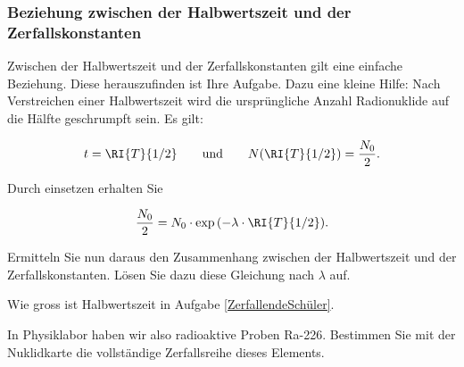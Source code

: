 \documentclass[12pt,a4paper,twoside]{article}
\newcommand{\alphaS}[4]{%
		\pgfmathsetmacro{\SUMM}{#1+#2}%
		\pgfmathsetmacro{\SUMMI}{#1+#2-4}%
		\draw[->](#1,#2) node [] {#3\num[dp=0]{\SUMM}}--++(-2,-2)  node [midway,above,rotate=45]{$\alpha$} node [] {#4\num[dp=0]{\SUMMI}};
}
\newcommand{\betaM}[4]{%
		\pgfmathsetmacro{\SUMM}{#1+#2}%
		\draw[->](#1,#2) node [] {#3\num[dp=0]{\SUMM}}--++(-1,1)  node [midway,above,rotate=-45]{$\beta^{-1}$} node [] {#4\num[dp=0]{\SUMMI}};
}
\begin{document}
\subsubsection*{Beziehung zwischen der Halbwertszeit und der Zerfallskonstanten}
Zwischen der Halbwertszeit und der Zerfallskonstanten gilt eine einfache Beziehung. 
Diese herauszufinden ist Ihre Aufgabe. Dazu eine kleine Hilfe: 
Nach Verstreichen einer Halbwertszeit wird die ursprüngliche Anzahl Radionuklide auf die Hälfte geschrumpft sein. Es gilt:

\begin{eqnarray*}
	t=\RI{T}{1/2}\qquad\text{und}\qquad N(\RI{T}{1/2}) =\frac{N_0}{2}\text{.}
\end{eqnarray*}



Durch einsetzen erhalten Sie

\begin{eqnarray*}
	\frac{N_0}{2}=N_0\cdot \exp{(-\lambda\cdot\RI{T}{1/2})}\text{.}
\end{eqnarray*}

\begin{aufgabe}
Ermitteln Sie nun daraus den Zusammenhang zwischen der Halbwertszeit und der Zerfallskonstanten. 
Lösen Sie dazu diese Gleichung nach $\lambda$ auf.
\end{aufgabe}



\begin{aufgabe}
	Wie gross ist Halbwertszeit in Aufgabe \ref{ZerfallendeSchüler}.
\end{aufgabe}


\begin{aufgabe}
	In Physiklabor haben wir also radioaktive Proben Ra-226.
	Bestimmen Sie mit der Nuklidkarte die vollständige Zerfallsreihe dieses Elements.

	\begin{loesung}

	\end{loesung}


\end{aufgabe}
\end{document}
